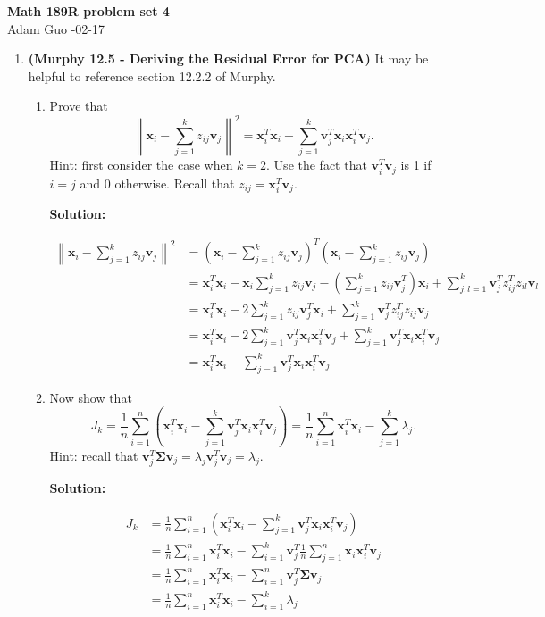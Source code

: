 \documentclass[letter,11pt]{article}
\newenvironment{solution}{
    \vspace{0.16in} {\bf Solution:}
    
}{
	\vspace{0.16in}
}
\newcommand{\xx}{\bm{x}}
\newcommand{\vv}{\bm{v}}
\newcommand{\T}{T}
\newcommand{\Sigmab}{\bm{\Sigma}}
\begin{document}
\begin{center}
    {\bf \Large Math 189R problem set 4} \\
    \vspace{0.1in}
    Adam Guo -02-17
\end{center}

\begin{enumerate}
    \item \textbf{(Murphy 12.5 - Deriving the Residual Error for PCA)} It may be helpful to reference section 12.2.2 of Murphy.

    \begin{enumerate}
        \item Prove that \[\left\|\xx_i - \sum_{j=1}^k z_{ij}\vv_j\right\|^2 = \xx_i^\T\xx_i - \sum_{j=1}^k\vv_j^\T \xx_i\xx_i^\T \vv_j.\] Hint: first consider the case when $k=2$. Use the fact that $\vv_i^\T\vv_j$ is 1 if $i=j$ and 0 otherwise. Recall that $z_{ij} = \xx_i^\T\vv_j$.

        \begin{solution}
            \begin{align*}
                \left\| \xx_i - \sum_{j=1}^k z_{ij} \vv_j \right\|^2 &= (\xx_i - \sum_{j=1}^k z_{ij} \vv_j)^T (\xx_i - \sum_{j=1}^k z_{ij} \vv_j) \\
                &= \xx_i^T \xx_i - \xx_i \sum_{j=1}^k z_{ij} \vv_{j} - \left(\sum_{j=1}^k z_{ij} \vv_{j}^T\right) \xx_i + \sum_{j, l = 1}^k \vv_j^T z_{ij}^T z_{il} \vv_l \\
                &= \xx_i^T \xx_i - 2\sum_{j=1}^k z_{ij} \vv_j^T \xx_i + \sum_{j=1}^k \vv_j^T z_{ij}^T z_{ij} \vv_j \\
                &= \xx_i^T \xx_i - 2\sum_{j=1}^k \vv_j^T \xx_i \xx_i^T \vv_j + \sum_{j=1}^k \vv_j^T \xx_i \xx_i^T \vv_j \\
                &= \xx_i^T \xx_i - \sum_{j=1}^k \vv_j^T \xx_i \xx_i^T \vv_j
            \end{align*}
        \end{solution}

        \item Now show that \[J_k = \frac{1}{n}\sum_{i=1}^n \left(\xx_i^\T \xx_i - \sum_{j=1}^k\vv_j^\T \xx_i\xx_i^\T \vv_j\right) = \frac{1}{n}\sum_{i=1}^n \xx_i^\T\xx_i - \sum_{j=1}^k\lambda_j.\] Hint: recall that $\vv_j^\T \Sigmab \vv_j = \lambda_j\vv_j^\T\vv_j = \lambda_j$.

        \begin{solution}
            \begin{align*}
                J_k &= \frac1n \sum_{i=1}^n \left(\xx_i^T \xx_i - \sum_{j=1}^k \vv_j^T \xx_i \xx_i^T \vv_j\right) \\
                &= \frac1n \sum_{i=1}^n \xx_i^T \xx_i - \sum_{i=1}^k \vv_j^T \frac1n \sum_{j=1}^n \xx_i \xx_i^T \vv_j \\
                &= \frac1n \sum_{i=1}^n \xx_i^T \xx_i - \sum_{i=1}^n \vv_j^T \Sigmab \vv_j \\
                &= \frac1n \sum_{i=1}^n \xx_i^T \xx_i - \sum_{i=1}^k \lambda_j
            \end{align*}
        \end{solution}


\end{enumerate}
\end{enumerate}
\end{document}
